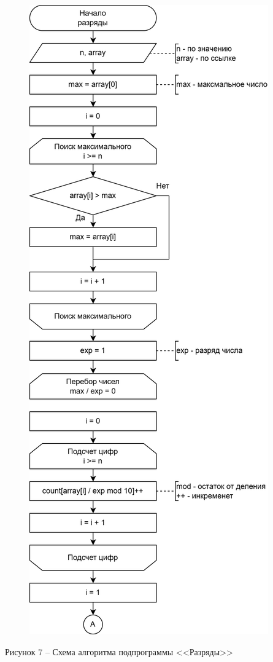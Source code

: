 \documentclass[a4paper,14pt]{extarticle}
\begin{document}
  \pagebreak
  \begin{figure}[h]
    \centering
    \includegraphics[width=0.43\linewidth]{images/s-2-3}
  \end{figure}
  \begin{center}
    Рисунок 7 – Схема алгоритма подпрограммы <<Разряды>>
  \end{center}
\end{document}
